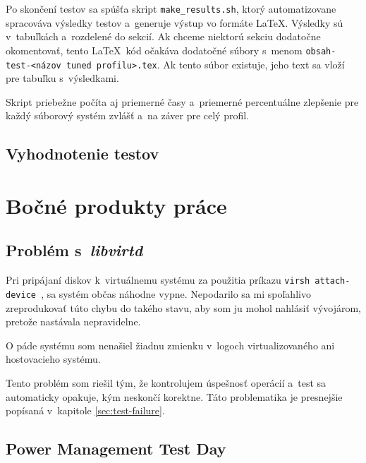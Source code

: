 Po skončení testov sa spúšťa skript \texttt{make\_results.sh}, ktorý
automatizovane spracováva výsledky testov a~generuje výstup vo formáte \LaTeX.
Výsledky sú v~tabuľkách a~rozdelené do sekcií. Ak chceme niektorú sekciu
dodatočne okomentovať, tento \LaTeX~kód očakáva dodatočné súbory s~menom
\texttt{obsah-test-<názov tuned profilu>.tex}. Ak tento súbor existuje, jeho
text sa vloží pre tabuľku s~výsledkami.

Skript priebežne počíta aj priemerné časy a~priemerné percentuálne zlepšenie
pre každý súborový systém zvlášť a~na záver pre celý profil. 

%
%

\section{Vyhodnotenie testov}


%
%

\chapter{Bočné produkty práce}

%
%

\section{Problém s~\emph{libvirtd}}
\label{sec:libvirt-problem}

Pri pripájaní diskov k~virtuálnemu systému za použitia príkazu \texttt{virsh
attach-device }, sa systém občas náhodne vypne. Nepodarilo sa mi spoľahlivo
zreprodukovať túto chybu do takého stavu, aby som ju mohol nahlásiť vývojárom,
pretože nastávala nepravidelne. 

O páde systému som nenašiel žiadnu zmienku v~logoch virtualizovaného ani
hostovacieho systému. 

Tento problém som riešil tým, že kontrolujem úspešnosť operácií a~test sa
automaticky opakuje, kým neskončí korektne. Táto problematika je presnejšie
popísaná v~kapitole \ref{sec:test-failure}.

%
%

\section{Power Management Test Day}

